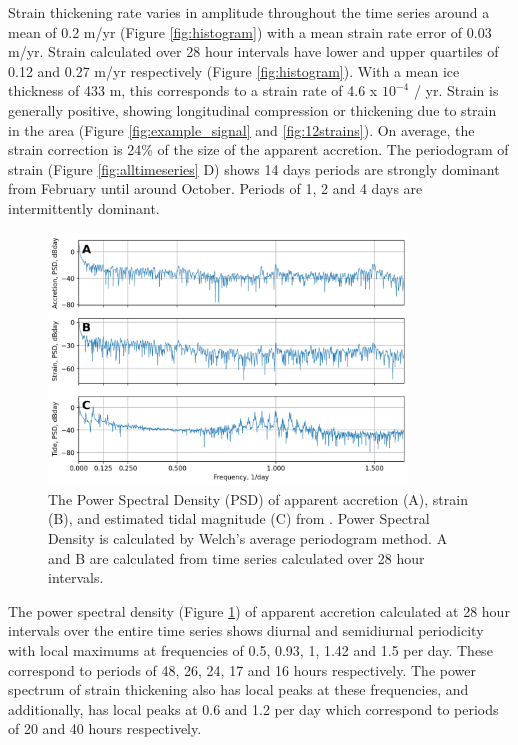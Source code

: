 Strain thickening rate varies in amplitude throughout the time series around a mean of 0.2 m/yr (Figure \ref{fig:histogram}) with a mean strain rate error of 0.03 m/yr. Strain calculated over 28 hour intervals have lower and upper quartiles of 0.12 and 0.27 m/yr  respectively (Figure \ref{fig:histogram}).   With a mean ice thickness of 433 m, this corresponds to a strain rate of 4.6 x $10^{-4}$ / yr.
Strain is generally positive, showing longitudinal compression or thickening due to strain in the area (Figure \ref{fig:example_signal} and \ref{fig:12strains}). On average, the strain correction is 24\% of the size of the apparent accretion. The periodogram of strain (Figure \ref{fig:alltimeseries} D) shows 14 days periods are strongly dominant from February until around October. %
Periods of 1, 2 and 4 days are intermittently dominant.

\begin{figure}[!ht]
\centering
\includegraphics[width=0.85\textwidth]{chapters/3/spectral_density.png}
\caption[Power Spectral Density of time series]{The Power Spectral Density (PSD) of  apparent accretion (A), strain (B), and estimated tidal magnitude (C) from \cite{padman2002new}. Power Spectral Density is calculated by Welch's average periodogram method. A and B are calculated from time series calculated over 28 hour intervals.
}
\label{fig:spectral_density}
\end{figure}

The power spectral density (Figure \ref{fig:spectral_density}) of apparent accretion calculated at 28 hour intervals over the entire time series shows diurnal and semidiurnal periodicity with local maximums at frequencies of 0.5, 0.93, 1, 1.42 and 1.5 per day. These correspond to periods of 48, 26, 24, 17 and 16 hours respectively. The power spectrum of strain thickening also has local peaks at these frequencies, and additionally, has local peaks at 0.6 and 1.2 per day which correspond to periods of 20 and 40 hours respectively. 


